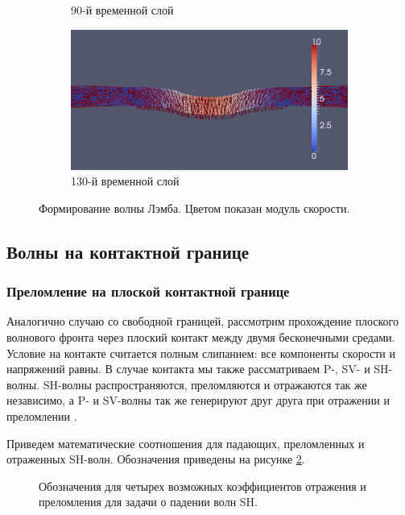 \begin{figure}[htp]
\begin{subfigure}[b]{0.5\textwidth}
\caption{90-й временной слой}
\end{subfigure}
\begin{subfigure}[b]{0.5\textwidth}
\centering
\includegraphics[width=\textwidth]{png/lamb-wave/130.png}
\caption{130-й временной слой}
\end{subfigure}
\caption{Формирование волны Лэмба. Цветом показан модуль скорости.}
\label{pic:lamb_wave}
\end{figure}


\clearpage
\newpage


\subsection{Волны на контактной границе}

\subsubsection{Преломление на плоской контактной границе}

Аналогично случаю со свободной границей, рассмотрим прохождение плоского волнового фронта через плоский контакт между двумя бесконечными средами. Условие на контакте считается полным слипанием: все компоненты скорости и напряжений равны. В случае контакта мы также рассматриваем P-, SV- и SH-волны. SH-волны распространяются, преломляются и отражаются так же независимо, а P- и SV-волны так же генерируют друг друга при отражении и преломлении \cite{aki_richards}. 

Приведем математические соотношения для падающих, преломленных и отраженных SH-волн. Обозначения приведены на рисунке \ref{pic:fig31}.

\begin{figure}[h]
\caption{Обозначения для четырех возможных коэффициентов отражения и преломления для задачи о падении волн SH.}
\label{pic:fig31}
\end{figure}

